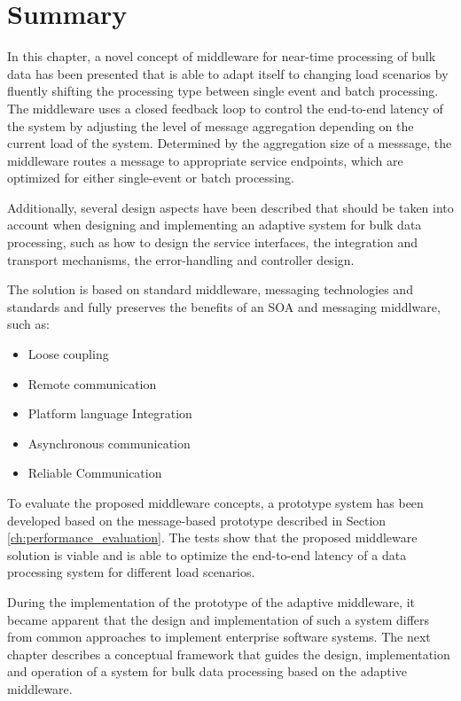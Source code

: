 \section{Summary}\label{sec:ch5_summary}

In this chapter, a novel concept of middleware for near-time processing of bulk data has been presented that is able to adapt itself to changing load scenarios by fluently shifting the processing type between single event and batch processing. The middleware uses a closed feedback loop to control the end-to-end latency of the system by adjusting the level of message aggregation depending on the current load of the system. Determined by the aggregation size of a messsage, the middleware routes a message to appropriate service endpoints, which are optimized for either single-event or batch processing.

Additionally, several design aspects have been described that should be taken into account when designing and implementing an adaptive system for bulk data processing, such as how to design the service interfaces, the integration and transport mechanisms, the error-handling and controller design.

The solution is based on standard middleware, messaging technologies and standards and fully preserves the benefits of an \ac{SOA} and messaging middlware, such as:

\begin{itemize}		
	\item Loose coupling
	\item Remote communication
	\item Platform language Integration
	\item Asynchronous communication
	\item Reliable Communication
\end{itemize}

To evaluate the proposed middleware concepts, a prototype system has been developed based on the message-based prototype described in Section \ref{ch:performance_evaluation}. The tests show that the proposed middleware solution is viable and is able to optimize the end-to-end latency of a data processing system for different load scenarios.

During the implementation of the prototype of the adaptive middleware, it became apparent that the design and implementation of such a system differs from common approaches to implement enterprise software systems. The next chapter describes a conceptual framework that guides the design, implementation and operation of a system for bulk data processing based on the adaptive middleware.


